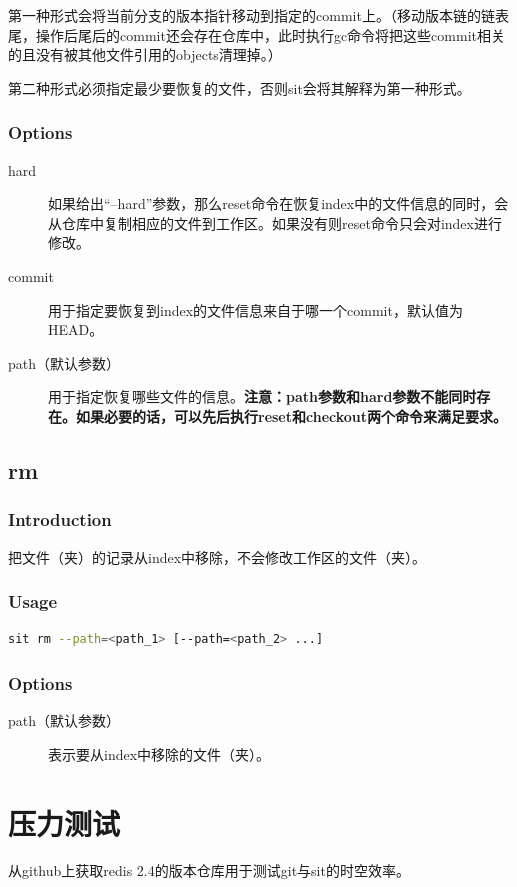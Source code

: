 \documentclass[11pt, a4paper, UTF8]{ctexart}
\begin{document}
第一种形式会将当前分支的版本指针移动到指定的commit上。（移动版本链的链表尾，操作后尾后的commit还会存在仓库中，此时执行gc命令将把这些commit相关的且没有被其他文件引用的objects清理掉。）

第二种形式必须指定最少要恢复的文件，否则sit会将其解释为第一种形式。
\subsubsection*{Options}
\begin{description}
	\item[\YaHeiMono hard] 如果给出``--hard''参数，那么reset命令在恢复index中的文件信息的同时，会从仓库中复制相应的文件到工作区。如果没有则reset命令只会对index进行修改。
	\item[\YaHeiMono commit] 用于指定要恢复到index的文件信息来自于哪一个commit，默认值为HEAD。
	\item[\YaHeiMono path（默认参数）] 用于指定恢复哪些文件的信息。\textbf{注意：path参数和hard参数不能同时存在。如果必要的话，可以先后执行reset和checkout两个命令来满足要求。}
\end{description}

\subsection{rm}
\subsubsection*{Introduction}
把文件（夹）的记录从index中移除，不会修改工作区的文件（夹）。
\subsubsection*{Usage}
\begin{lstlisting}[language=sh,basicstyle=\small\YaHeiMono,numbers=none]
sit rm --path=<path_1> [--path=<path_2> ...]
\end{lstlisting}
\subsubsection*{Options}
\begin{description}
	\item[\YaHeiMono path（默认参数）] 表示要从index中移除的文件（夹）。
\end{description}

\section{压力测试}
从github上获取redis 2.4的版本仓库用于测试git与sit的时空效率。
\end{document}
